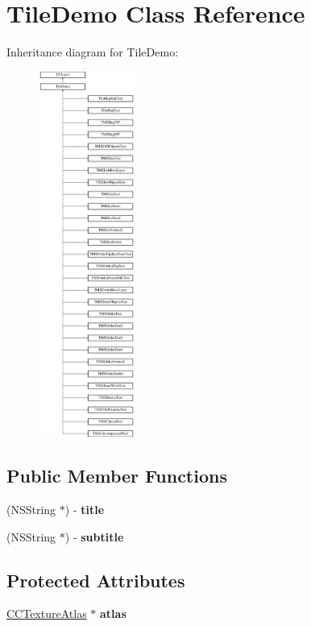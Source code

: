 \hypertarget{interface_tile_demo}{\section{Tile\-Demo Class Reference}
\label{interface_tile_demo}
}
Inheritance diagram for Tile\-Demo\-:\begin{figure}[H]
\begin{center}
\leavevmode
\includegraphics[height=12.000000cm]{interface_tile_demo}
\end{center}
\end{figure}
\subsection*{Public Member Functions}
\begin{DoxyCompactItemize}
\item 
\hypertarget{interface_tile_demo_a2a969372f63fe0a6aebbe735b9a93c8d}{(N\-S\-String $\ast$) -\/ {\bfseries title}}\label{interface_tile_demo_a2a969372f63fe0a6aebbe735b9a93c8d}

\item 
\hypertarget{interface_tile_demo_ab09b992a7391a40422bbca23b62e2fec}{(N\-S\-String $\ast$) -\/ {\bfseries subtitle}}\label{interface_tile_demo_ab09b992a7391a40422bbca23b62e2fec}

\end{DoxyCompactItemize}
\subsection*{Protected Attributes}
\begin{DoxyCompactItemize}
\item 
\hypertarget{interface_tile_demo_af2cb0fac3c4c1ff1e13a5706f211950f}{\hyperlink{interface_c_c_texture_atlas}{C\-C\-Texture\-Atlas} $\ast$ {\bfseries atlas}}\label{interface_tile_demo_af2cb0fac3c4c1ff1e13a5706f211950f}

\end{DoxyCompactItemize}


